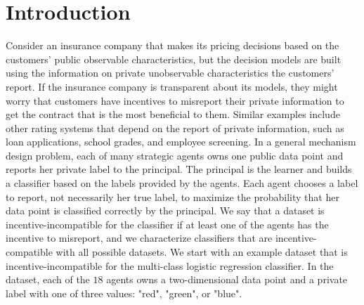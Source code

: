 \documentclass{article}
\begin{document}
\section{Introduction} 
Consider an insurance company that makes its pricing decisions based on the customers' public observable characteristics, but the decision models are built using the information on private unobservable characteristics the customers' report. If the insurance company is transparent about its models, they might worry that customers have incentives to misreport their private information to get the contract that is the most beneficial to them. Similar examples include other rating systems that depend on the report of private information, such as loan applications, school grades, and employee screening.
\newline \newline
In a general mechanism design problem, each of many strategic agents owns one public data point and reports her private label to the principal. The principal is the learner and builds a classifier based on the labels provided by the agents. Each agent chooses a label to report, not necessarily her true label, to maximize the probability that her data point is classified correctly by the principal. We say that a dataset is incentive-incompatible for the classifier if at least one of the agents has the incentive to misreport, and we characterize classifiers that are incentive-compatible with all possible datasets.
\newline \newline
We start with an example dataset that is incentive-incompatible for the multi-class logistic regression classifier. In the dataset, each of the $18$ agents owns a two-dimensional data point and a private label with one of three values: "red", "green", or "blue".
\newline \newline
\end{document}
